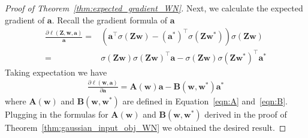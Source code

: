 \documentclass{article}
\newcommand{\firstlayer}{w}
\newcommand{\secondlayer}{a}
\newcommand{\mat}[1]{\mathbf{#1}}
\newcommand{\vect}[1]{\mathbf{#1}}
\newcommand{\relu}[1]{\sigma\left(#1\right)}
\begin{document}
\begin{proof}[Proof of Theorem~\ref{thm:expected_gradient_WN}]
Next, we calculate the expected gradient of $\vect{\secondlayer}$.
Recall the gradient formula of $\vect{\secondlayer}$\begin{align*}
\frac{\partial \ell(\mat{Z},\vect{\firstlayer},\vect{\secondlayer})}{\vect{\secondlayer}} = &\left(\vect{\secondlayer}^\top\relu{\mat{Z}\vect{\firstlayer}}-(\vect{\secondlayer}^*)^\top\relu{\mat{Z}\vect{\firstlayer}^*}\right)\relu{\mat{Z}\vect{\firstlayer}} \\
= & \relu{\mat{Z}\vect{\firstlayer}}\relu{\mat{Z}\vect{\firstlayer}}^\top\vect{\secondlayer} - \relu{\mat{Z}\vect{\firstlayer}}\relu{\mat{Z}\vect{\firstlayer}^*}^\top\vect{\secondlayer}^* 
\end{align*}
Taking expectation we have
\begin{align*}
\frac{\partial \ell\left(\vect{\firstlayer},\vect{\secondlayer}\right)}{\partial \vect{\secondlayer}} =  \mat{A}\left(\vect{\firstlayer}\right)\vect{\secondlayer} - \mat{B}\left(\vect{\firstlayer},\vect{\firstlayer}^*\right)\vect{\secondlayer}^*
\end{align*}
where $\mat{A}\left(\vect{\firstlayer}\right)$ and $\mat{B}\left(\vect{\firstlayer},\vect{\firstlayer}^*\right)$ are defined in Equation~\eqref{eqn:A} and~\eqref{eqn:B}.
Plugging in the formulas for $\mat{A}\left(\vect{\firstlayer}\right)$ and $\mat{B}\left(\vect{\firstlayer},\vect{\firstlayer}^*\right)$ derived in the proof of Theorem~\ref{thm:gaussian_input_obj_WN} we obtained the desired result.


\end{proof}
\end{document}
